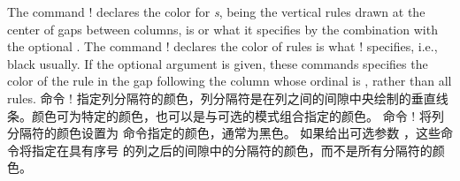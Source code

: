 \begin{description}
\item[\Midx{\!\colseprulecolor!}\oarg{mode}\marg{color}\oarg{col}]\mbox{}
\mbox{}\par
{}
\begin{paracol}{2}
The command \!\colseprulecolor! declares the color for
{\em\Uidx\cseprule{}s}, being the vertical rules drawn at the center of
gaps between columns, is  or what it specifies by the
combination with the optional .  The command
\!\normalcolseprulecolor! declares the color of rules is what
\!\normalcolor! specifies, i.e., black usually.  If the optional argument
 is given, these commands specifies the color of the rule in the
gap following the column whose ordinal is , rather than all rules.
\switchcolumn
命令 \!\colseprulecolor! 指定列分隔符的颜色，列分隔符是在列之间的间隙中央绘制的垂直线条。颜色可为特定的颜色，也可以是与可选的模式组合指定的颜色。
命令 \!\normalcolseprulecolor! 将列分隔符的颜色设置为 \normalcolor 命令指定的颜色，通常为黑色。
如果给出可选参数 ，这些命令将指定在具有序号  的列之后的间隙中的分隔符的颜色，而不是所有分隔符的颜色。
\end{paracol}

\begin{itemize}

\end{itemize}
\end{description}

